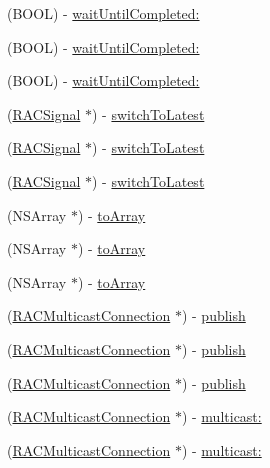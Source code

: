 \begin{DoxyCompactItemize}
(B\+O\+OL) -\/ \mbox{\hyperlink{interface_r_a_c_signal_af4c476fc335ca830841bd4fd267f05ce}{wait\+Until\+Completed\+:}}
\item 
(B\+O\+OL) -\/ \mbox{\hyperlink{interface_r_a_c_signal_af4c476fc335ca830841bd4fd267f05ce}{wait\+Until\+Completed\+:}}
\item 
(B\+O\+OL) -\/ \mbox{\hyperlink{interface_r_a_c_signal_af4c476fc335ca830841bd4fd267f05ce}{wait\+Until\+Completed\+:}}
\item 
(\mbox{\hyperlink{interface_r_a_c_signal}{R\+A\+C\+Signal}} $\ast$) -\/ \mbox{\hyperlink{interface_r_a_c_signal_a0a6780c4580e1a5338a9a891f7c69ea1}{switch\+To\+Latest}}
\item 
(\mbox{\hyperlink{interface_r_a_c_signal}{R\+A\+C\+Signal}} $\ast$) -\/ \mbox{\hyperlink{interface_r_a_c_signal_a0a6780c4580e1a5338a9a891f7c69ea1}{switch\+To\+Latest}}
\item 
(\mbox{\hyperlink{interface_r_a_c_signal}{R\+A\+C\+Signal}} $\ast$) -\/ \mbox{\hyperlink{interface_r_a_c_signal_a0a6780c4580e1a5338a9a891f7c69ea1}{switch\+To\+Latest}}
\item 
(N\+S\+Array $\ast$) -\/ \mbox{\hyperlink{interface_r_a_c_signal_a5b7a649ea4635f423b73cd4924652fe5}{to\+Array}}
\item 
(N\+S\+Array $\ast$) -\/ \mbox{\hyperlink{interface_r_a_c_signal_a5b7a649ea4635f423b73cd4924652fe5}{to\+Array}}
\item 
(N\+S\+Array $\ast$) -\/ \mbox{\hyperlink{interface_r_a_c_signal_a5b7a649ea4635f423b73cd4924652fe5}{to\+Array}}
\item 
(\mbox{\hyperlink{interface_r_a_c_multicast_connection}{R\+A\+C\+Multicast\+Connection}} $\ast$) -\/ \mbox{\hyperlink{interface_r_a_c_signal_a16f260eea2cfd9a3953b95926d442a93}{publish}}
\item 
(\mbox{\hyperlink{interface_r_a_c_multicast_connection}{R\+A\+C\+Multicast\+Connection}} $\ast$) -\/ \mbox{\hyperlink{interface_r_a_c_signal_a16f260eea2cfd9a3953b95926d442a93}{publish}}
\item 
(\mbox{\hyperlink{interface_r_a_c_multicast_connection}{R\+A\+C\+Multicast\+Connection}} $\ast$) -\/ \mbox{\hyperlink{interface_r_a_c_signal_a16f260eea2cfd9a3953b95926d442a93}{publish}}
\item 
(\mbox{\hyperlink{interface_r_a_c_multicast_connection}{R\+A\+C\+Multicast\+Connection}} $\ast$) -\/ \mbox{\hyperlink{interface_r_a_c_signal_a55b43f4fbef7e430a4587ce13eab18cb}{multicast\+:}}
\item 
(\mbox{\hyperlink{interface_r_a_c_multicast_connection}{R\+A\+C\+Multicast\+Connection}} $\ast$) -\/ \mbox{\hyperlink{interface_r_a_c_signal_a55b43f4fbef7e430a4587ce13eab18cb}{multicast\+:}}

\end{DoxyCompactItemize}
